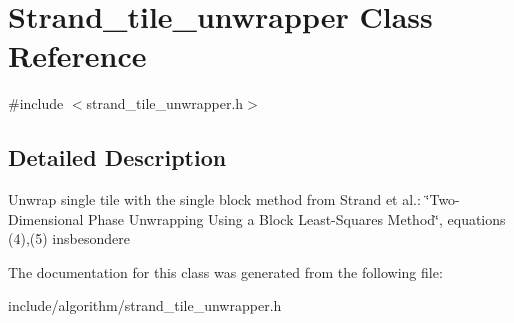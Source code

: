 \hypertarget{class_strand__tile__unwrapper}{\section{Strand\-\_\-tile\-\_\-unwrapper Class Reference}
\label{class_strand__tile__unwrapper}
}


{\ttfamily \#include $<$strand\-\_\-tile\-\_\-unwrapper.\-h$>$}



\subsection{Detailed Description}
Unwrap single tile with the single block method from Strand et al.\-: \char`\"{}\-Two-\/\-Dimensional Phase Unwrapping Using a Block Least-\/\-Squares Method\char`\"{}, equations (4),(5) insbesondere 

The documentation for this class was generated from the following file\-:\begin{DoxyCompactItemize}
\item 
include/algorithm/strand\-\_\-tile\-\_\-unwrapper.\-h\end{DoxyCompactItemize}

